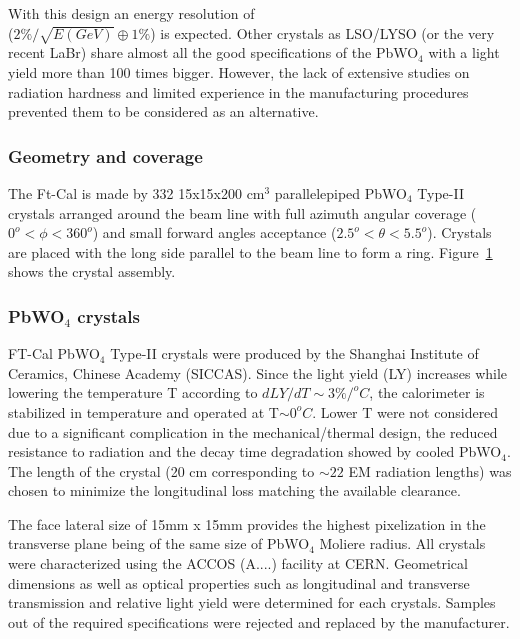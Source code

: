 With this design
 an energy resolution of \\
($2\% /\sqrt{E(GeV)} \oplus 1\%$) is expected.
Other crystals as LSO/LYSO (or the very recent LaBr) share almost all the good specifications of the PbWO$_4$ with a light yield more than 100 times bigger. However, the lack of extensive studies on radiation hardness and limited experience in the manufacturing procedures prevented them to be considered as an alternative.

\begin{figure}[th!]
\centering 
\caption{} 
\label{fig:ft-cal-geometry} 
\end{figure}

\subsubsection{Geometry and coverage}
The Ft-Cal is made by 332 15x15x200 cm$^3$ parallelepiped PbWO$_4$ Type-II crystals arranged around the beam line  with full azimuth angular coverage ($0^o<\phi<360^o$)   and small forward angles  acceptance ($2.5^o<\theta<5.5^o$). Crystals are placed with the long side parallel to the beam line to form a ring. Figure~\ref{fig:ft-cal-geometry} shows the crystal assembly. 

\subsubsection{PbWO$_4$ crystals}
FT-Cal PbWO$_4$ Type-II crystals were produced by the Shanghai Institute of Ceramics, Chinese Academy (SICCAS). Since the light yield (LY) increases while lowering the temperature T according to $dLY/dT \sim 3\%/^oC$, the calorimeter is stabilized in temperature and operated at T$\sim 0 ^oC$. Lower T were not considered due to a significant complication in the mechanical/thermal design,  the reduced resistance to radiation  and the decay time degradation showed by cooled PbWO$_4$.
The length of the crystal (20 cm corresponding to $\sim22$ EM radiation lengths) was chosen to minimize the longitudinal loss matching the available clearance.

The face lateral size of 15mm x 15mm  provides the highest pixelization in the transverse plane being  of the same size of  PbWO$_4$  Moliere radius.  All crystals were characterized using the ACCOS (A....)  facility  at CERN. Geometrical dimensions as well as optical properties such as longitudinal and transverse  transmission and relative light yield were determined for each crystals. Samples out of the required specifications were rejected and replaced by the manufacturer. 

